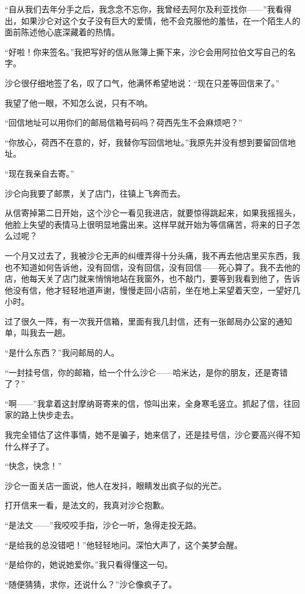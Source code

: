 \par “自从我们去年分手之后，我念念不忘你，我曾经去阿尔及利亚找你——”我看得出，如果沙仑对这个女子没有巨大的爱情，他不会克服他的羞怯，在一个陌生人的面前陈述他心底深藏着的热情。
\par “好啦！你来签名。”我把写好的信从账簿上撕下来，沙仑会用阿拉伯文写自己的名字。
\par 沙仑很仔细地签了名，叹了口气，他满怀希望地说：“现在只差等回信来了。”
\par 我望了他一眼，不知怎么说，只有不响。
\par “回信地址可以用你们的邮局信箱号码吗？荷西先生不会麻烦吧？”
\par “你放心，荷西不在意的，好，我替你写回信地址。”我原先并没有想到要留回信地址。
\par “现在我亲自去寄。”
\par 沙仑向我要了邮票，关了店门，往镇上飞奔而去。
\par 从信寄掉第二日开始，这个沙仑一看见我进店，就要惊得跳起来，如果我摇摇头，他脸上失望的表情马上很明显地露出来。这样早就开始为等信痛苦，将来的日子怎么过呢？
\par 一个月又过去了，我被沙仑无声的纠缠弄得十分头痛，我不再去他店里买东西，我也不知道如何告诉他，没有回信，没有回信，没有回信——死心算了。我不去他的店，他每天关了店门就来悄悄地站在我窗外，也不敲门，要等到我看到他了，告诉他没有信，他才轻轻地道声谢，慢慢走回小店前，坐在地上呆望着天空，一望好几小时。
\par 过了很久一阵，有一次我开信箱，里面有我几封信，还有一张邮局办公室的通知单，叫我去一趟。
\par “是什么东西？”我问邮局的人。
\par “一封挂号信，你的邮箱，给一个什么沙仑——哈米达，是你的朋友，还是寄错了？”
\par “啊——”我拿着这封摩纳哥寄来的信，惊叫出来，全身寒毛竖立。抓起了信，往回家的路上快步走去。
\par 我完全错估了这件事情，她不是骗子，她来信了，还是挂号信，沙仑要高兴得不知什么样子了。
\par “快念，快念！”
\par 沙仑一面关店一面说，他人在发抖，眼睛发出疯子似的光芒。
\par 打开信来一看，是法文的，我真对沙仑抱歉。
\par “是法文——”我咬咬手指，沙仑一听，急得走投无路。
\par “是给我的总没错吧！”他轻轻地问。深怕大声了，这个美梦会醒。
\par “是给你的，她说她爱你。”我只看得懂这一句。
\par “随便猜猜，求你，还说什么？”沙仑像疯子了。
